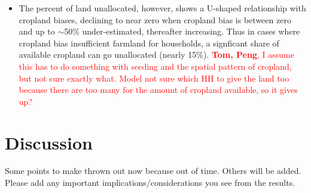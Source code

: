 \documentclass{pnastwo}
\begin{document}
\begin{article}
\begin{itemize}
  \item The percent of land unallocated, however, shows a U-shaped relationship with cropland biases, declining to near zero when cropland bias is between zero and up to $\sim$50\% under-estimated, thereafter increasing. Thus in cases where cropland bias insufficient farmland for households, a signficant share of available cropland can go unallocated (nearly 15\%).  \textcolor{red}{\textbf{Tom, Peng}, I assume this has to do something with seeding and the spatial pattern of cropland, but not sure exactly what. Model not sure which HH to give the land too because there are too many for the amount of cropland available, so it gives up? }
\end{itemize}


\section{Discussion}

Some points to make thrown out now because out of time. Others will be added. Please add any important implications/considerations you see from the results.  


\end{article}
\end{document}
